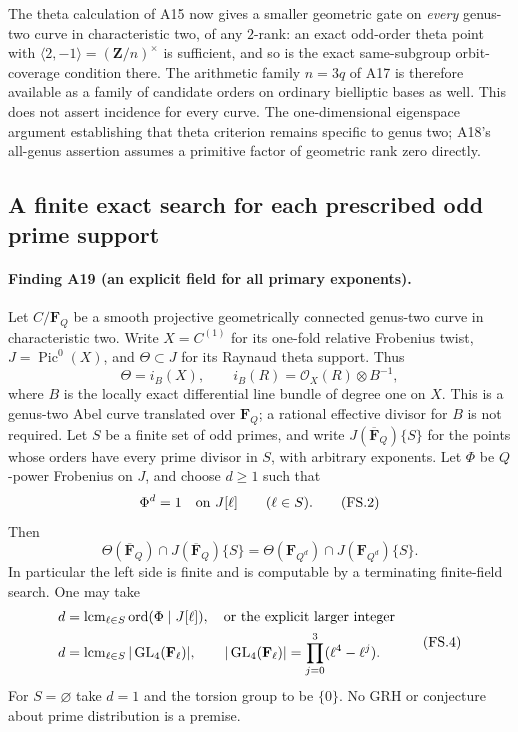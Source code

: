 \documentclass[11pt,a4paper]{article}
\begin{document}
The theta calculation of A15 now gives a smaller geometric
gate on \emph{every} genus-two curve in characteristic two,
of any $2$-rank: an exact odd-order theta point with
$\langle2,-1\rangle=(\mathbf Z/n)^\times$ is sufficient,
and so is the exact same-subgroup orbit-coverage condition
there.  The arithmetic family $n=3q$ of A17 is therefore
available as a family of candidate orders on ordinary
bielliptic bases as well.
This does not assert incidence for every curve.  The
one-dimensional eigenspace argument establishing that
theta criterion remains specific to genus two; A18's
all-genus assertion assumes a primitive factor of geometric
rank zero directly.


\subsection{A finite exact search for each prescribed odd prime support}
\label{sec:finite-support-theta}

\paragraph{Finding A19 (an explicit field for all primary exponents).}
Let $C/\mathbf F_Q$ be a smooth projective geometrically connected
genus-two curve in characteristic two. Write $X=C^{(1)}$ for its
one-fold relative Frobenius twist, $J=\operatorname{Pic}^0(X)$,
and $\Theta\subset J$ for its Raynaud theta support. Thus
\[
 \Theta=i_B(X),\qquad
 i_B(R)=\mathcal O_X(R)\otimes B^{-1},
                                                               \tag{FS.1}
\]
where $B$ is the locally exact differential line bundle of degree
one on $X$. This is a genus-two Abel curve translated over
$\mathbf F_Q$; a rational effective divisor for $B$ is not required.
Let $S$ be a finite set of odd primes, and write $J(\overline{\mathbf
F}_Q)\{S\}$ for the points whose orders have every prime divisor in
$S$, with arbitrary exponents. Let $\Phi$ be $Q$-power Frobenius on
$J$, and choose $d\ge1$ such that
\[
            \Phi^d=1\quad\hbox{on }J[\ell]
                         \qquad(\ell\in S).                  \tag{FS.2}
\]
Then
\[
 \Theta(\overline{\mathbf F}_Q)\cap J(\overline{\mathbf F}_Q)\{S\}
   =\Theta(\mathbf F_{Q^d})\cap J(\mathbf F_{Q^d})\{S\}.
                                                               \tag{FS.3}
\]
In particular the left side is finite and is computable by a
terminating finite-field search. One may take
\[
 \begin{split}
 d&=\operatorname{lcm}_{\ell\in S}
                  \operatorname{ord}(\Phi\mid J[\ell]),
       \quad\hbox{or the explicit larger integer}\\
 d&=\operatorname{lcm}_{\ell\in S}
                    |\operatorname{GL}_4(\mathbf F_\ell)|,
 \qquad |\operatorname{GL}_4(\mathbf F_\ell)|
                   =\prod_{j=0}^3(\ell^4-\ell^j).
 \end{split}                                                   \tag{FS.4}
\]
For $S=\varnothing$ take $d=1$ and the torsion group to be $\{0\}$.
No GRH or conjecture about prime distribution is a premise.
\end{document}
